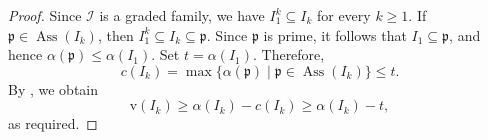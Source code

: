 \documentclass[11pt,reqno,a4paper]{amsart}
\theoremstyle{definition}
\begin{document}
\begin{proof}

 Since $\mathcal{I}$ is a graded family, we have $I_1^k\subseteq I_k$ for every $k\ge1$. If $\mathfrak{p}\in\operatorname{Ass}(I_k)$, then $I_1^k\subseteq I_k\subseteq\mathfrak{p}$. Since $\mathfrak{p}$ is prime, it follows that $I_1\subseteq\mathfrak{p}$, and hence $\alpha(\mathfrak{p})\le\alpha(I_1)$. Set $t=\alpha(I_1)$. Therefore,
\[
c(I_k)=\max\{\alpha(\mathfrak{p})\mid\mathfrak{p}\in\operatorname{Ass}(I_k)\}\le t.
\]
By \cite[Lemma 3.1]{BiswasMandalSaha24}, we obtain
\[
\mathrm{v}(I_k)\ge\alpha(I_k)-c(I_k)\ge\alpha(I_k)-t,
\]
as required.
\end{proof}
\end{document}
